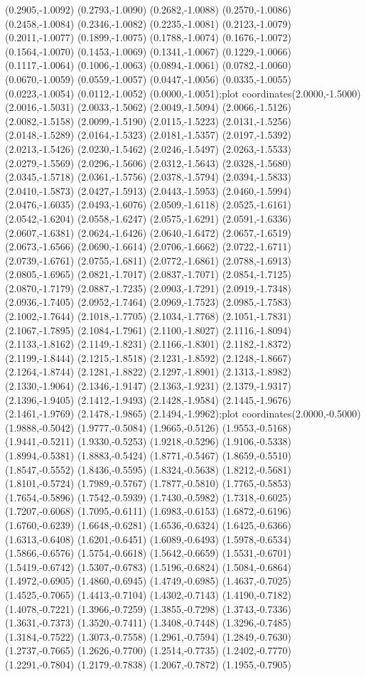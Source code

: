{(0.2905,-1.0092) (0.2793,-1.0090) (0.2682,-1.0088) (0.2570,-1.0086) (0.2458,-1.0084) (0.2346,-1.0082) (0.2235,-1.0081) (0.2123,-1.0079) (0.2011,-1.0077) (0.1899,-1.0075) (0.1788,-1.0074) (0.1676,-1.0072) (0.1564,-1.0070) (0.1453,-1.0069) (0.1341,-1.0067) (0.1229,-1.0066) (0.1117,-1.0064) (0.1006,-1.0063) (0.0894,-1.0061) (0.0782,-1.0060) (0.0670,-1.0059) (0.0559,-1.0057) (0.0447,-1.0056) (0.0335,-1.0055) (0.0223,-1.0054) (0.0112,-1.0052) (0.0000,-1.0051)};plot coordinates{(2.0000,-1.5000) (2.0016,-1.5031) (2.0033,-1.5062) (2.0049,-1.5094) (2.0066,-1.5126) (2.0082,-1.5158) (2.0099,-1.5190) (2.0115,-1.5223) (2.0131,-1.5256) (2.0148,-1.5289) (2.0164,-1.5323) (2.0181,-1.5357) (2.0197,-1.5392) (2.0213,-1.5426) (2.0230,-1.5462) (2.0246,-1.5497) (2.0263,-1.5533) (2.0279,-1.5569) (2.0296,-1.5606) (2.0312,-1.5643) (2.0328,-1.5680) (2.0345,-1.5718) (2.0361,-1.5756) (2.0378,-1.5794) (2.0394,-1.5833) (2.0410,-1.5873) (2.0427,-1.5913) (2.0443,-1.5953) (2.0460,-1.5994) (2.0476,-1.6035) (2.0493,-1.6076) (2.0509,-1.6118) (2.0525,-1.6161) (2.0542,-1.6204) (2.0558,-1.6247) (2.0575,-1.6291) (2.0591,-1.6336) (2.0607,-1.6381) (2.0624,-1.6426) (2.0640,-1.6472) (2.0657,-1.6519) (2.0673,-1.6566) (2.0690,-1.6614) (2.0706,-1.6662) (2.0722,-1.6711) (2.0739,-1.6761) (2.0755,-1.6811) (2.0772,-1.6861) (2.0788,-1.6913) (2.0805,-1.6965) (2.0821,-1.7017) (2.0837,-1.7071) (2.0854,-1.7125) (2.0870,-1.7179) (2.0887,-1.7235) (2.0903,-1.7291) (2.0919,-1.7348) (2.0936,-1.7405) (2.0952,-1.7464) (2.0969,-1.7523) (2.0985,-1.7583) (2.1002,-1.7644) (2.1018,-1.7705) (2.1034,-1.7768) (2.1051,-1.7831) (2.1067,-1.7895) (2.1084,-1.7961) (2.1100,-1.8027) (2.1116,-1.8094) (2.1133,-1.8162) (2.1149,-1.8231) (2.1166,-1.8301) (2.1182,-1.8372) (2.1199,-1.8444) (2.1215,-1.8518) (2.1231,-1.8592) (2.1248,-1.8667) (2.1264,-1.8744) (2.1281,-1.8822) (2.1297,-1.8901) (2.1313,-1.8982) (2.1330,-1.9064) (2.1346,-1.9147) (2.1363,-1.9231) (2.1379,-1.9317) (2.1396,-1.9405) (2.1412,-1.9493) (2.1428,-1.9584) (2.1445,-1.9676) (2.1461,-1.9769) (2.1478,-1.9865) (2.1494,-1.9962)};plot coordinates{(2.0000,-0.5000) (1.9888,-0.5042) (1.9777,-0.5084) (1.9665,-0.5126) (1.9553,-0.5168) (1.9441,-0.5211) (1.9330,-0.5253) (1.9218,-0.5296) (1.9106,-0.5338) (1.8994,-0.5381) (1.8883,-0.5424) (1.8771,-0.5467) (1.8659,-0.5510) (1.8547,-0.5552) (1.8436,-0.5595) (1.8324,-0.5638) (1.8212,-0.5681) (1.8101,-0.5724) (1.7989,-0.5767) (1.7877,-0.5810) (1.7765,-0.5853) (1.7654,-0.5896) (1.7542,-0.5939) (1.7430,-0.5982) (1.7318,-0.6025) (1.7207,-0.6068) (1.7095,-0.6111) (1.6983,-0.6153) (1.6872,-0.6196) (1.6760,-0.6239) (1.6648,-0.6281) (1.6536,-0.6324) (1.6425,-0.6366) (1.6313,-0.6408) (1.6201,-0.6451) (1.6089,-0.6493) (1.5978,-0.6534) (1.5866,-0.6576) (1.5754,-0.6618) (1.5642,-0.6659) (1.5531,-0.6701) (1.5419,-0.6742) (1.5307,-0.6783) (1.5196,-0.6824) (1.5084,-0.6864) (1.4972,-0.6905) (1.4860,-0.6945) (1.4749,-0.6985) (1.4637,-0.7025) (1.4525,-0.7065) (1.4413,-0.7104) (1.4302,-0.7143) (1.4190,-0.7182) (1.4078,-0.7221) (1.3966,-0.7259) (1.3855,-0.7298) (1.3743,-0.7336) (1.3631,-0.7373) (1.3520,-0.7411) (1.3408,-0.7448) (1.3296,-0.7485) (1.3184,-0.7522) (1.3073,-0.7558) (1.2961,-0.7594) (1.2849,-0.7630) (1.2737,-0.7665) (1.2626,-0.7700) (1.2514,-0.7735) (1.2402,-0.7770) (1.2291,-0.7804) (1.2179,-0.7838) (1.2067,-0.7872) (1.1955,-0.7905) }
